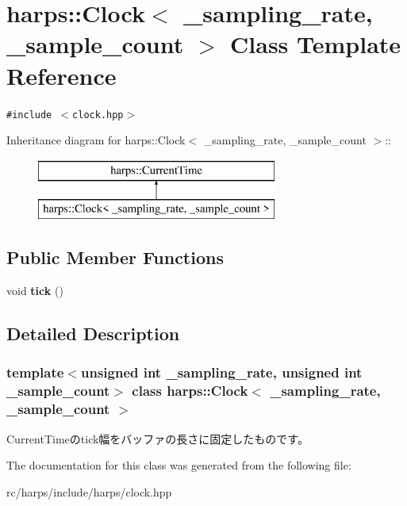 \section{harps::Clock$<$ \_\-sampling\_\-rate, \_\-sample\_\-count $>$ Class Template Reference}
\label{classharps_1_1Clock}
{\tt \#include $<$clock.hpp$>$}

Inheritance diagram for harps::Clock$<$ \_\-sampling\_\-rate, \_\-sample\_\-count $>$::\begin{figure}[H]
\begin{center}
\leavevmode
\includegraphics[height=2cm]{classharps_1_1Clock}
\end{center}
\end{figure}
\subsection*{Public Member Functions}
\begin{CompactItemize}
\item 
void \textbf{tick} ()\label{classharps_1_1Clock_39971acf3b3d864c1e3484ee055d93ef}

\end{CompactItemize}


\subsection{Detailed Description}
\subsubsection*{template$<$unsigned int \_\-sampling\_\-rate, unsigned int \_\-sample\_\-count$>$ class harps::Clock$<$ \_\-sampling\_\-rate, \_\-sample\_\-count $>$}

CurrentTimeのtick幅をバッファの長さに固定したものです。 

The documentation for this class was generated from the following file:\begin{CompactItemize}
\item 
rc/harps/include/harps/clock.hpp\end{CompactItemize}
